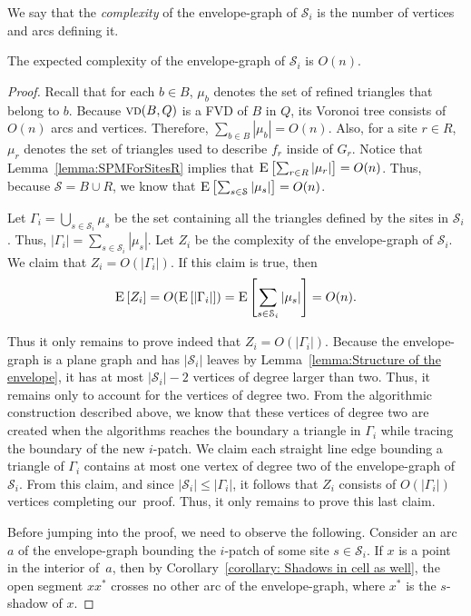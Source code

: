 \documentclass[a4paper,UKenglish]{socg-lipics-v2018}
\newcommand{\icell}[1][i]{${#1}$-patch\xspace}
\newcommand{\s}{\mathcal S}
\newcommand{\vd}[2][P]{\textsc{vd}(#2, #1)}
\newcommand{\ex}[1]{\textsc{E}\left[#1\right]}
\begin{document}
We say that the \emph{complexity} of the envelope-graph of $\s_i$ is the number of vertices and arcs defining it.

\begin{lemma}\label{lemma: Complexity of envelope-graph}
The expected complexity of the envelope-graph of $\s_i$ is $O(n)$.
\end{lemma}
\begin{proof}
Recall that for each $b\in B$, $\mu_b$ denotes the set of refined triangles that belong to $b$. 
Because $\vd[Q]{B}$ is a FVD of $B$ in $Q$, its Voronoi tree consists of $O(n)$ arcs and vertices.
Therefore, $\sum_{b\in B} |\mu_b| = O(n)$.
Also, for a site $r\in R$, $\mu_r$ denotes the set of triangles used to describe $f_r$ inside of $G_r$.
Notice that Lemma~\ref{lemma:SPMForSitesR} implies that  $\ex{\sum_{r\in R} |\mu_r|}= O(n)$.
Thus, because $\s = B\cup R$, we know that  $\ex{\sum_{s\in \s} |\mu_s|} = O(n)$.

Let $\Gamma_i = \bigcup_{s\in \s_i} \mu_s$ be the set containing all the triangles defined by the sites in $\s_i$.
Thus, $|\Gamma_i| = \sum_{s\in \s_i}|\mu_s|$.
Let $Z_i$ be the complexity of the envelope-graph of $\s_i$. 
We claim that $Z_i= O(|\Gamma_i|)$. If this claim is true, then 
\[ \ex{Z_i} = O(\ex{|\Gamma_i|})= \ex{\sum_{s\in \s_i} |\mu_s|} = O(n). \]

Thus it only remains to prove indeed that $Z_i= O(|\Gamma_i|)$.
Because the envelope-graph is a plane graph and has $|\s_i|$ leaves by Lemma~\ref{lemma:Structure of the envelope}, it has at most $|\s_i| - 2$ vertices of degree larger than two.
Thus, it remains only to account for the vertices of degree two.
From the algorithmic construction described above,
we know that these vertices of degree two are created when the algorithms reaches the boundary a triangle in $\Gamma_i$ while tracing the boundary of the new \icell. 
We claim each straight line edge bounding a triangle of $\Gamma_i$ contains at most one vertex of degree two of the envelope-graph of $\s_i$.
From this claim, and since $|\s_i|\leq |\Gamma_i|$, it follows that  $Z_i$ consists of $O(|\Gamma_i|)$ vertices completing our~proof.
Thus, it only remains to prove this last claim.

Before jumping into the proof, we need to observe the following.
Consider an arc $a$ of the envelope-graph bounding the \icell of some site $s\in \s_i$.
If $x$ is a point in the interior of~$a$, then by Corollary~\ref{corollary: Shadows in cell as well}, 
the open segment $x x^*$ crosses no other arc of the envelope-graph, where $x^*$ is the $s$-shadow of $x$.


\end{proof}
\end{document}
